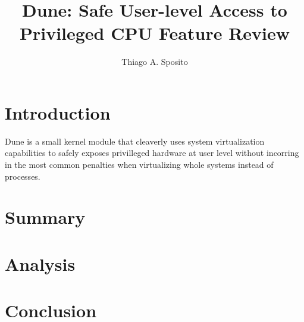 \documentclass[12pt]{article}
\title{Dune: Safe User-level Access to Privileged CPU Feature Review}
\author{Thiago A. Sposito\inst{1} }
\begin{document}
 

\maketitle


\section{Introduction}
Dune is a small kernel module that cleaverly uses system virtualization capabilities to safely exposes privilleged hardware at user level without incorring in the most common penalties when virtualizing whole systems instead of processes. 

\section{Summary}

\section{Analysis}

\section{Conclusion}



\end{document}
